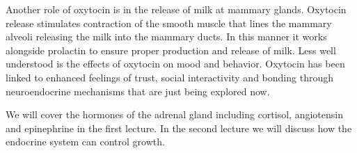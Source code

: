 \documentclass{tufte-handout}
\begin{document}
Another role of oxytocin is in the release of milk at mammary glands.  Oxytocin release stimulates contraction of the smooth muscle that lines the mammary alveoli releasing the milk into the mammary ducts.  In this manner it works alongside prolactin to ensure proper production and release of milk.  Less well understood is the effects of oxytocin on mood and behavior.  Oxytocin has been linked to enhanced feelings of trust, social interactivity and bonding through neuroendocrine mechanisms that are just being explored now.

  We will cover the hormones of the adrenal gland including cortisol, angiotensin and epinephrine in the first lecture.  In the second lecture we will discuss how the endocrine system can control growth.

\listoffigures
\listoftables



\end{document}
